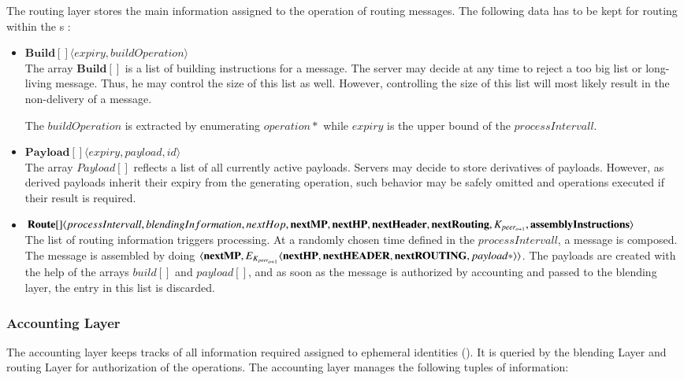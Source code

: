 The routing layer stores the main information assigned to the operation of routing messages. The following data has to be kept for routing within the s :
\begin{itemize}
	\item $\mathbf{Build[]}\langle expiry, buildOperation \rangle$\\
	The array $\mathbf{Build[]}$ is a list of building instructions for a message. The server may decide at any time to reject a too big list or long-living message. Thus, he may control the size of this list as well. However, controlling the size of this list will most likely result in the non-delivery of a message. 
	
	The $buildOperation$ is extracted by enumerating $operation*$ while $expiry$ is the upper bound of the $processIntervall$.
	\item $\mathbf{Payload[]}\langle expiry, payload, id \rangle$\\
	The array $Payload[]$ reflects a list of all currently active payloads. Servers may decide to store derivatives of payloads. However, as derived payloads inherit their expiry from the generating operation, such behavior may be safely omitted and operations executed if their result is required.
	
	\item $\splitatcommas{\mathbf{Route[]}\langle processIntervall, blendingInformation, nextHop, \mathbf{nextMP}, \mathbf {nextHP}, \mathbf{nextHeader}, \mathbf{nextRouting}, K_{peer_{o+1}}, \mathbf{assemblyInstructions} \rangle}$\\
	The list of routing information triggers processing. At a randomly chosen time defined in the $processIntervall$, a message is composed. The message is assembled by doing $\splitatcommas{\langle \mathbf{nextMP}, E_{K_{peer_{o+1}}}\langle \mathbf{nextHP}, \mathbf{nextHEADER}, \mathbf{nextROUTING}, payload* \rangle \rangle}$. The payloads are created with the help of the arrays $build[]$ and $payload[]$, and as soon as the message is authorized by accounting and passed to the blending layer, the entry in this list is discarded.
\end{itemize}

\subsubsection{Accounting Layer}\label{sec:accountingLayer}
The accounting layer keeps tracks of all information required assigned to ephemeral identities (). It is queried by the blending Layer and routing Layer for authorization of the operations. The accounting layer manages the following tuples of information:

